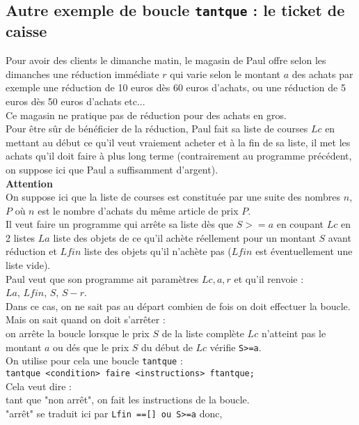 \documentclass[12pt,a4paper]{book}
\begin{document}
\begin{giacjshere}
\section{Autre exemple de boucle {\tt tantque} : le ticket de caisse}
Pour avoir des clients le dimanche matin, le magasin de Paul offre selon 
les dimanches une r\'eduction imm\'ediate $r$ qui varie selon le montant 
$a$ des achats par exemple une r\'eduction de 10 euros d\`es 60 euros 
d'achats, ou  une r\'eduction de 5 euros d\`es 50 euros d'achats etc...\\
Ce magasin ne pratique pas de r\'eduction pour des achats en gros.\\
Pour \^etre s\^ur de b\'en\'eficier de la r\'eduction, Paul fait sa liste
de courses $Lc$ en mettant au d\'ebut ce qu'il veut vraiement acheter et \`a la
fin de sa liste, il met les achats qu'il doit faire \`a plus long terme
(contrairement au programme pr\'ec\'edent, on suppose ici 
que Paul a suffisamment d'argent).\\
{\bf Attention}\\
On suppose ici que la liste de courses est constitu\'ee par une suite des 
nombres $n$,$P$ o\`u $n$ est le nombre d'achats du m\^eme article de prix $P$.\\
Il veut faire un programme qui arr\^ete sa liste d\`es que $S>=a$ en coupant 
$Lc$ en 2 listes $La$ liste des objets de ce qu'il ach\`ete r\'eellement pour 
un montant $S$ avant r\'eduction et $Lfin$ liste des objets qu'il 
n'ach\`ete pas ($Lfin$ est \'eventuellement une liste vide).\\
Paul veut que son programme ait param\`etres $Lc,a,r$ et qu'il renvoie :\\
$La$, $Lfin$, $S$, $S-r$.\\ 
Dans ce cas, on ne sait pas au d\'epart combien de fois on doit effectuer la 
boucle.\\
Mais on sait quand on doit s'arr\^eter :\\
on arr\^ete la boucle lorsque le prix $S$ de la liste compl\`ete $Lc$ 
n'atteint pas le montant $a$ ou d\'es que le prix $S$ du d\'ebut de $Lc$ 
v\'erifie {\tt S>=a}.\\
On utilise pour cela une boucle {\tt tantque} :\\
{\tt tantque <condition> faire <instructions> ftantque;}\\
Cela veut dire :\\
tant que "non arr\^et", on fait les instructions de la boucle.\\
"arr\^et" se traduit ici par {\tt Lfin ==[] ou S>=a} donc, \\

\end{giacjshere}
\end{document}
